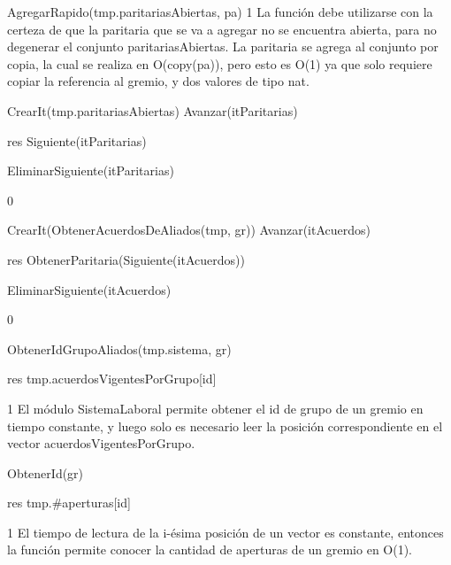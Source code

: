 {
	\state AgregarRapido(tmp.paritariasAbiertas, pa)		
}
{1}
{ La función debe utilizarse con la certeza de que la paritaria que se va a agregar no se encuentra abierta, para no degenerar el conjunto paritariasAbiertas. La paritaria se agrega al conjunto por copia, la cual se realiza en O(copy(pa)), pero esto es O(1) ya que solo requiere copiar la referencia al gremio, y dos valores de tipo nat. }

{
	\state {} \asig CrearIt(tmp.paritariasAbiertas)		
			
		\state
		\state Avanzar(itParitarias)								
	\endwhile
	\state

	\state res \asig Siguiente(itParitarias)						

	\state EliminarSiguiente(itParitarias)							
}
{0}
{\addtocounter{lipsumcounter}{1}}

{
	\state {} \asig CrearIt(ObtenerAcuerdosDeAliados(tmp, gr))		
			
		\state
		\state Avanzar(itAcuerdos)  								
	\endwhile
	\state

	\state res \asig ObtenerParitaria(Siguiente(itAcuerdos))		

	\state EliminarSiguiente(itAcuerdos)							
}
{0}
{\addtocounter{lipsumcounter}{1}}

{
	\state {} \asig ObtenerIdGrupoAliados(tmp.sistema, gr)		

	\state res \asig tmp.acuerdosVigentesPorGrupo[id]							
}
{1}
{ El módulo SistemaLaboral permite obtener el id de grupo de un gremio en tiempo constante, y luego solo es necesario leer la posición correspondiente en el vector acuerdosVigentesPorGrupo. }

{
	\state {} \asig ObtenerId(gr)			

	\state res \asig tmp.\#aperturas[id]					
}
{1}
{ El tiempo de lectura de la i-ésima posición de un vector es constante, entonces la función permite conocer la cantidad de aperturas de un gremio en O(1). }